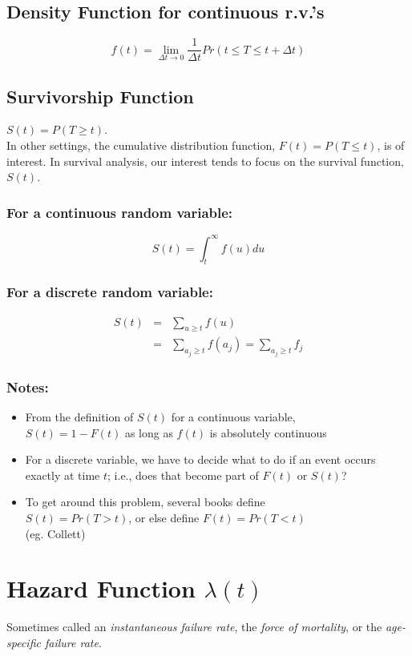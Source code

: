 \documentclass[11pt,slidesonly,semrot,portrait,palatino]{book}
\begin{document}
\subsection{Density Function for continuous r.v.'s}
\[  f(t) = \lim_{\Delta t \rightarrow 0}
 \frac{1}{\Delta t}  Pr(t \le T \le t+\Delta t) \]
\subsection{Survivorship Function}
$ S(t) = P(T \ge t)$. \\[2ex]
In other settings, the cumulative distribution function, \newline
$F(t)=P(T\le t)$, is of interest.  In survival analysis, our
interest tends to focus on the survival function, $S(t)$.
\subsubsection{For a continuous random variable:}
\[   S(t) = \int_{t}^{\infty} f(u) du \]
\subsubsection{For a discrete random variable:}
\begin{eqnarray*}
S(t) & = & \sum_{u \ge t} f(u) \\[1ex]
     & = & \sum_{a_j \ge t} f(a_j) = \sum_{a_j \ge t} f_j
\end{eqnarray*}
\subsubsection{Notes:}
\begin{itemize}
\item  From the definition of $S(t)$ for a continuous variable,\\
$S(t)=1-F(t)$ as long as $f(t)$ is absolutely continuous
\item  For a discrete variable, we have to decide what to do if an
event occurs exactly at time $t$; i.e., does that become part of $F(t)$ or
$S(t)$?
\item To get around this problem, several books define \\
$S(t)=Pr(T>t)$, or else define $F(t)=Pr(T<t)$ \\(eg. Collett)
\end{itemize}
\section{Hazard Function $\lambda(t)$}
Sometimes called an {\em instantaneous failure
rate}, the {\em force of mortality}, or the
{\em age-specific failure rate}.
\end{document}
